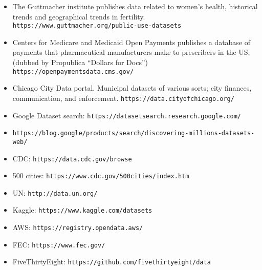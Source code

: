 \documentclass[]{book}
\theoremstyle{definition}
\newtheorem*{soln}{Solution}
\begin{document}
\begin{enumerate}
\begin{itemize}
\item The Guttmacher institute publishes data related to women's health,  historical trends and geographical trends in fertility.
\texttt{https://www.guttmacher.org/public-use-datasets}

\item Centers for Medicare and Medicaid Open Payments publishes a database of payments that pharmacutical manufacturers make to prescribers in the US, (dubbed by Propublica ``Dollars for Docs'')
\texttt{https://openpaymentsdata.cms.gov/}

\item Chicago City Data portal.  Municipal datasets of various sorts; city finances, communication, and enforcement.
\texttt{https://data.cityofchicago.org/}

\item 
Google Dataset search: \texttt{https://datasetsearch.research.google.com/}
\item
\texttt{https://blog.google/products/search/discovering-millions-datasets-web/}
\item
CDC: \texttt{https://data.cdc.gov/browse}
\item
500 cities: \texttt{https://www.cdc.gov/500cities/index.htm}
\item
UN: \texttt{http://data.un.org/}
\item
Kaggle: \texttt{https://www.kaggle.com/datasets}
\item
AWS: \texttt{https://registry.opendata.aws/}
\item
FEC: \texttt{https://www.fec.gov/}
\item
FiveThirtyEight: \texttt{https://github.com/fivethirtyeight/data}

\end{itemize}


\end{enumerate}
\end{document}
